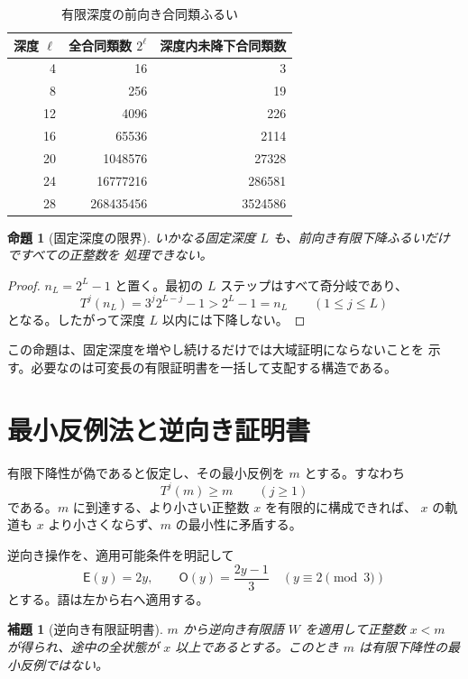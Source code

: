 \documentclass[a4paper,11pt]{ltjsarticle}
\theoremstyle{definition}
\theoremstyle{plain}
\newtheorem{proposition}[definition]{命題}
\newtheorem{lemma}[definition]{補題}
\newcommand{\Odd}{\mathsf{O}}
\newcommand{\Even}{\mathsf{E}}
\newcommand{\1}{\mathbf{1}}
\begin{document}
\begin{table}[htbp]
\centering
\caption{有限深度の前向き合同類ふるい}
\label{tab:sieve}
\begin{tabular}{r@{\quad}r@{\quad}r}
\toprule
深度 $\ell$ & 全合同類数 $2^\ell$ & 深度内未降下合同類数\\
\midrule
4  & 16        & 3\\
8  & 256       & 19\\
12 & 4096      & 226\\
16 & 65536     & 2114\\
20 & 1048576   & 27328\\
24 & 16777216  & 286581\\
28 & 268435456 & 3524586\\
\bottomrule
\end{tabular}
\end{table}

\begin{proposition}[固定深度の限界]
いかなる固定深度 $L$ も、前向き有限下降ふるいだけですべての正整数を
処理できない。
\end{proposition}

\begin{proof}
$n_L=2^L-1$ と置く。最初の $L$ ステップはすべて奇分岐であり、
\[
 T^j(n_L)=3^j2^{L-j}-1>2^L-1=n_L
 \qquad(1\le j\le L)
\]
となる。したがって深度 $L$ 以内には下降しない。
\end{proof}

この命題は、固定深度を増やし続けるだけでは大域証明にならないことを
示す。必要なのは可変長の有限証明書を一括して支配する構造である。

\section{最小反例法と逆向き証明書}

有限下降性が偽であると仮定し、その最小反例を $m$ とする。すなわち
\[
 T^j(m)\ge m\qquad(j\ge1)
\]
である。$m$ に到達する、より小さい正整数 $x$ を有限的に構成できれば、
$x$ の軌道も $x$ より小さくならず、$m$ の最小性に矛盾する。

逆向き操作を、適用可能条件を明記して
\begin{equation}\label{eq:inverse}
 \Even(y)=2y,\qquad
 \Odd(y)=\frac{2y-1}{3}\quad(y\equiv2\pmod3)
\end{equation}
とする。語は左から右へ適用する。

\begin{lemma}[逆向き有限証明書]
$m$ から逆向き有限語 $W$ を適用して正整数 $x<m$ が得られ、途中の全状態が
$x$ 以上であるとする。このとき $m$ は有限下降性の最小反例ではない。
\end{lemma}
\end{document}
